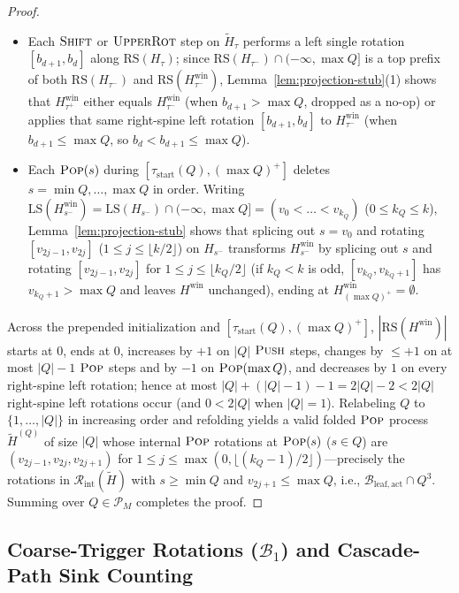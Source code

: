 \documentclass[11pt]{article}
\theoremstyle{definition}
\theoremstyle{remark}
\newcommand{\LS}{\mathrm{LS}}
\newcommand{\RS}{\mathrm{RS}}
\newcommand{\PUSH}{\textnormal{\scshape Push}}
\newcommand{\POP}{\textnormal{\scshape Pop}}
\newcommand{\SHIFT}{\textnormal{\scshape Shift}}
\newcommand{\UPROT}{\textnormal{\scshape UpperRot}}
\begin{document}
\begin{proof}
\begin{itemize}[leftmargin=2em]
  \item Each $\SHIFT$ or $\UPROT$ step on $\widetilde{H}_\tau$ performs a left single rotation $[b_{d+1}, b_d]$ along $\RS(H_\tau)$; since $\RS(H_{\tau^-}) \cap (-\infty, \max Q]$ is a top prefix of both $\RS(H_{\tau^-})$ and $\RS(H_{\tau^-}^{\mathrm{win}})$, Lemma~\ref{lem:projection-stub}(1) shows that $H_{\tau^+}^{\mathrm{win}}$ either equals $H_{\tau^-}^{\mathrm{win}}$ (when $b_{d+1} > \max Q$, dropped as a no-op) or applies that same right-spine left rotation $[b_{d+1}, b_d]$ to $H_{\tau^-}^{\mathrm{win}}$ (when $b_{d+1} \le \max Q$, so $b_d < b_{d+1} \le \max Q$).
  \item Each $\POP(s)$ during $[\tau_{\mathrm{start}}(Q), (\max Q)^+]$ deletes $s = \min Q, \dots, \max Q$ in order. Writing $\LS(H_{s^-}^{\mathrm{win}}) = \LS(H_{s^-}) \cap (-\infty, \max Q] = (v_0 < \dots < v_{k_Q})$ ($0 \le k_Q \le k$), Lemma~\ref{lem:projection-stub} shows that splicing out $s = v_0$ and rotating $[v_{2j-1}, v_{2j}]$ ($1 \le j \le \lfloor k/2 \rfloor$) on $H_{s^-}$ transforms $H_{s^-}^{\mathrm{win}}$ by splicing out $s$ and rotating $[v_{2j-1}, v_{2j}]$ for $1 \le j \le \lfloor k_Q / 2 \rfloor$ (if $k_Q < k$ is odd, $[v_{k_Q}, v_{k_Q+1}]$ has $v_{k_Q+1} > \max Q$ and leaves $H^{\mathrm{win}}$ unchanged), ending at $H_{(\max Q)^+}^{\mathrm{win}} = \emptyset$.
\end{itemize}
Across the prepended initialization and $[\tau_{\mathrm{start}}(Q), (\max Q)^+]$, $|\RS(H^{\mathrm{win}})|$ starts at $0$, ends at $0$, increases by $+1$ on $|Q|$ $\PUSH$ steps, changes by $\le +1$ on at most $|Q| - 1$ $\POP$ steps and by $-1$ on $\POP(\max Q)$, and decreases by $1$ on every right-spine left rotation; hence at most $|Q| + (|Q| - 1) - 1 = 2|Q| - 2 < 2|Q|$ right-spine left rotations occur (and $0 < 2|Q|$ when $|Q| = 1$). Relabeling $Q$ to $\{1, \dots, |Q|\}$ in increasing order and refolding yields a valid folded $\POP$ process $\widetilde{H}^{(Q)}$ of size $|Q|$ whose internal $\POP$ rotations at $\POP(s)$ ($s \in Q$) are $(v_{2j-1}, v_{2j}, v_{2j+1})$ for $1 \le j \le \max(0, \lfloor (k_Q - 1)/2 \rfloor)$---precisely the rotations in $\mathcal{R}_{\mathrm{int}}(\widetilde{H})$ with $s \ge \min Q$ and $v_{2j+1} \le \max Q$, i.e., $\mathcal{B}_{\mathrm{leaf,act}} \cap Q^3$. Summing over $Q \in \mathcal{P}_M$ completes the proof.
\end{proof}


\subsection{Coarse-Trigger Rotations (\texorpdfstring{$\mathcal{B}_1$}{B1}) and Cascade-Path Sink Counting}
\label{subsec:b1}
\end{document}
